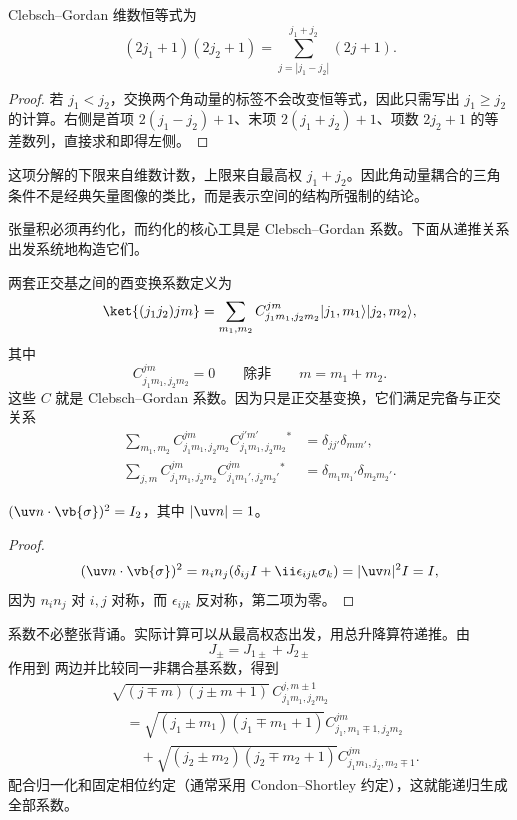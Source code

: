 \begin{proposition}
Clebsch--Gordan 维数恒等式为
\[
(2j_1+1)(2j_2+1)
=\sum_{j=|j_1-j_2|}^{j_1+j_2}(2j+1).
\]
\end{proposition}

\begin{proof}
若 $j_1<j_2$，交换两个角动量的标签不会改变恒等式，因此只需写出 $j_1\ge j_2$ 的计算。右侧是首项 $2(j_1-j_2)+1$、末项 $2(j_1+j_2)+1$、项数 $2j_2+1$ 的等差数列，直接求和即得左侧。
\end{proof}


这项分解的下限来自维数计数，上限来自最高权 $j_1+j_2$。因此角动量耦合的三角条件不是经典矢量图像的类比，而是表示空间的结构所强制的结论。

张量积必须再约化，而约化的核心工具是 Clebsch--Gordan 系数。下面从递推关系出发系统地构造它们。

两套正交基之间的酉变换系数定义为
\begin{equation}
\ket{(j_1j_2)jm}
=
\sum_{m_1,m_2}
C^{jm}_{j_1m_1,j_2m_2}
\lvert j_1,m_1\rangle\lvert j_2,m_2\rangle,
\label{eq:cg-definition}
\end{equation}
其中
\[
C^{jm}_{j_1m_1,j_2m_2}=0
\qquad\text{除非}\qquad m=m_1+m_2.
\]
这些 $C$ 就是 Clebsch--Gordan 系数。因为只是正交基变换，它们满足完备与正交关系
\begin{align}
\sum_{m_1,m_2}
C^{jm}_{j_1m_1,j_2m_2}
C^{j'm'}_{j_1m_1,j_2m_2}{}^*
&=\delta_{jj'}\delta_{mm'},\label{eq:cg-orthogonality-1}\\
\sum_{j,m}
C^{jm}_{j_1m_1,j_2m_2}
C^{jm}_{j_1m_1',j_2m_2'}{}^*
&=\delta_{m_1m_1'}\delta_{m_2m_2'}.
\label{eq:cg-orthogonality-2}
\end{align}

\begin{proposition}
 $(\uv n\cdot\vb{\sigma})^2=I_2$，其中 $\lvert\uv n\rvert=1$。
\end{proposition}

\begin{proof}
\[
(\uv n\cdot\vb{\sigma})^2
=n_i n_j(\delta_{ij}I+\ii\epsilon_{ijk}\sigma_k)
=\lvert\uv n\rvert^2I=I,
\]
因为 $n_i n_j$ 对 $i,j$ 对称，而 $\epsilon_{ijk}$ 反对称，第二项为零。
\end{proof}


系数不必整张背诵。实际计算可以从最高权态出发，用总升降算符递推。由
\[
J_\pm=J_{1\pm}+J_{2\pm}
\]
作用到  两边并比较同一非耦合基系数，得到
\begin{align}
&\sqrt{(j\mp m)(j\pm m+1)}\,
C^{j,m\pm1}_{j_1m_1,j_2m_2}
\nonumber\\
&\quad=
\sqrt{(j_1\pm m_1)(j_1\mp m_1+1)}
C^{jm}_{j_1,m_1\mp1,j_2m_2}
\nonumber\\
&\qquad+
\sqrt{(j_2\pm m_2)(j_2\mp m_2+1)}
C^{jm}_{j_1m_1,j_2,m_2\mp1}.
\label{eq:cg-recursion}
\end{align}
配合归一化和固定相位约定（通常采用 Condon--Shortley 约定），这就能递归生成全部系数。

